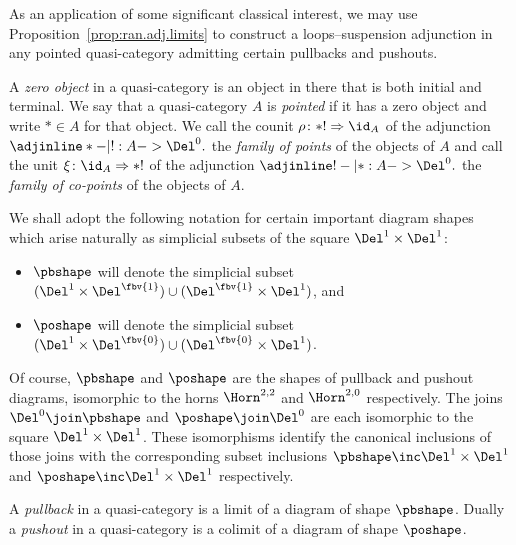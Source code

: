 As an application of some significant classical interest, we may use Proposition~\ref{prop:ran.adj.limits} to construct a loops--suspension adjunction in any pointed quasi-category admitting certain pullbacks and pushouts.

\begin{defn}
    A \emph{zero object} in a quasi-category is an object in there that is both initial and terminal. We say that a quasi-category $A$ is {\em pointed\/} if it has a zero object and write $*\in A$ for that object. We call the counit $\rho\colon *!\Rightarrow\id_A$ of the adjunction $\adjinline * -| ! : A -> \Del^0.$ the {\em family of points\/} of the objects of $A$ and call the unit $\xi\colon \id_A\Rightarrow *!$ of the adjunction $\adjinline ! -| * : A -> \Del^0.$ the {\em family of co-points\/} of the objects of $A$.
\end{defn}

\begin{ntn}\label{ntn:pb.po.joins}
  We shall adopt the following notation for certain important diagram shapes which arise naturally as simplicial subsets of the square $\Del^1\times\Del^1$:
  \begin{itemize}
    \item $\pbshape$ will denote the simplicial subset $(\Del^1\times\Del^{\fbv{1}})\cup(\Del^{\fbv{1}}\times\Del^1)$, and
    \item $\poshape$  will denote the simplicial subset $(\Del^1\times\Del^{\fbv{0}})\cup(\Del^{\fbv{0}}\times\Del^1)$.
  \end{itemize}
  Of course, $\pbshape$ and $\poshape$ are the shapes of pullback and pushout diagrams,   isomorphic to the horns $\Horn^{2,2}$ and $\Horn^{2,0}$ respectively.    The joins $\Del^0\join\pbshape$ and $\poshape\join\Del^0$ are each isomorphic to the square $\Del^1\times\Del^1$. These isomorphisms identify the canonical inclusions of those joins with the corresponding subset inclusions $\pbshape\inc\Del^1\times\Del^1$ and $\poshape\inc\Del^1\times\Del^1$ respectively.
\end{ntn}

\begin{defn}
  A {\em pullback\/} in a quasi-category is a limit of a diagram of shape $\pbshape$. Dually a {\em pushout\/} in a quasi-category is a colimit of a diagram of shape $\poshape$. 
\end{defn}

